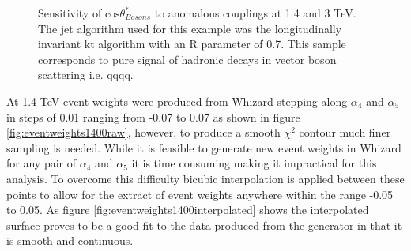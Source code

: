 \begin{figure}
\caption[Sensitivity of $\text{cos}\theta^{8}_{Bosons}$ to the anomalous gauge couplings $\alpha_{4}$ and $\alpha_{5}$ at 1.4 and 3 TeV.]{Sensitivity of $\text{cos}\theta^{*}_{Bosons}$ to anomalous couplings at 1.4 and 3 TeV. The jet algorithm used for this example was the longitudinally invariant kt algorithm with an R parameter of 0.7. This sample corresponds to pure signal of hadronic decays in vector boson scattering i.e. \nu{\nu}qqqq.}
\label{fig:costhetastarbosons}
\end{figure}

At 1.4 TeV event weights were produced from Whizard stepping along $\alpha_{4}$ and $\alpha_{5}$ in steps of 0.01 ranging from -0.07 to 0.07 as shown in figure \ref{fig:eventweights1400raw}, however, to produce a smooth $\chi^{2}$ contour much finer sampling is needed.  While it is feasible to generate new event weights in Whizard for any pair of $\alpha_{4}$ and $\alpha_{5}$ it is time consuming making it impractical for this analysis.  To overcome this difficulty bicubic interpolation is applied between these points to allow for the extract of event weights anywhere within the range -0.05 to 0.05.  As figure \ref{fig:eventweights1400interpolated} shows the interpolated surface proves to be a good fit to the data produced from the generator in that it is smooth and continuous.  

